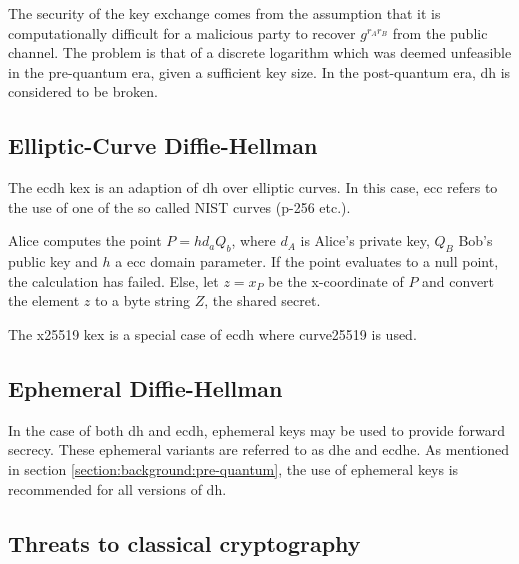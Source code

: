 The security of the key exchange comes from the assumption that it is computationally difficult for a malicious party to recover $g^{r_A r_B}$ from the public channel. The problem is that of a discrete logarithm which was deemed unfeasible in the pre-quantum era, given a sufficient key size\cite{boyd2020}. In the post-quantum era, \gls{dh} is considered to be broken\cite{bernstein2017}.

\subsection{Elliptic-Curve Diffie-Hellman}

The \gls{ecdh} \gls{kex} is an adaption of \gls{dh} over elliptic curves. In this case, \gls{ecc} refers to the use of one of the so called NIST curves (\gls{p-256} etc.)\cite{nist2018}.

Alice computes the point $P=hd_aQ_b$, where $d_A$ is Alice's private key, $Q_B$ Bob's public key and $h$ a \gls{ecc} domain parameter. If the point evaluates to a null point, the calculation has failed. Else, let $z=x_P$ be the x-coordinate of $P$ and convert the element $z$ to a byte string $Z$, the shared secret.

The \gls{x25519} \gls{kex} is a special case of \gls{ecdh} where \gls{curve25519} is used\cite{rfc7748}. 

\subsection{Ephemeral Diffie-Hellman}

In the case of both \gls{dh} and \gls{ecdh}, ephemeral keys may be used to provide forward secrecy. These ephemeral variants are referred to as \gls{dhe} and \gls{ecdhe}. As mentioned in section \ref{section:background:pre-quantum}, the use of ephemeral keys is recommended for all versions of \gls{dh}.

\subsection{Threats to classical cryptography}


